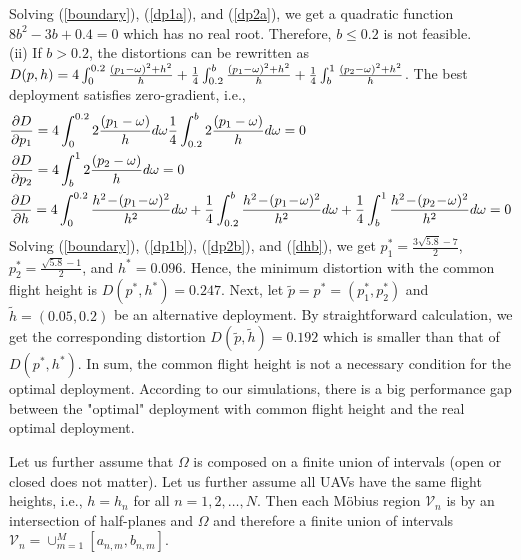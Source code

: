 \documentclass[smallabstract,smallcaptions]{dccpaper}
\newcommand{\Vor}{\ensuremath{\mathcal{V}}}         %
\begin{document}
Solving (\ref{boundary}), (\ref{dp1a}), and (\ref{dp2a}), we get a quadratic function $8b^2-3b+0.4=0$ which has no real root.
Therefore, $b\le0.2$ is not feasible.\\
(ii) If $b>0.2$, the distortions can be rewritten as
$D(p,h)=4\int_{0}^{0.2}\frac{(p_1-\omega)^2+h^2}{h}+\frac{1}{4}\int_{0.2}^{b}\frac{(p_1-\omega)^2+h^2}{h} + \frac{1}{4}\int_{b}^{1}\frac{(p_2-\omega)^2+h^2}{h}$. 
The best deployment satisfies zero-gradient, i.e.,
\begin{align}
    &\frac{\partial D}{\partial p_1} = 4\int_{0}^{0.2}2\frac{(p_1-\ome)}{h}d\ome
    \frac{1}{4}\int_{0.2}^{b}2\frac{(p_1-\ome)}{h}d\ome=0 \label{dp1b}\\
    &\frac{\partial D}{\partial p_2} = 4\int_{b}^{1}2\frac{(p_2-\ome)}{h}d\ome=0\label{dp2b}\\
    &\frac{\partial D}{\partial h} = 4\int_{0}^{0.2}\frac{h^2\!-\!(p_1\!-\!\ome)^2}{h^2}d\ome 
    + \frac{1}{4}\int_{0.2}^{b}\frac{h^2\!-\!(p_1\!-\!\ome)^2}{h^2}d\ome 
    + \frac{1}{4}\int_{b}^1\frac{h^2\!-\!(p_2\!-\!\ome)^2}{h^2}d\ome= 0\label{dhb}
\end{align}
%
Solving (\ref{boundary}), (\ref{dp1b}), (\ref{dp2b}), and (\ref{dhb}), we get $p^*_1=\frac{3\sqrt{5.8}-7}{2}$,
$p^*_2=\frac{\sqrt{5.8}-1}{2}$, and $h^*=0.096$.  Hence, the minimum distortion with the common flight height is $D(p^*,
h^*)=0.247$.  Next, let $\widetilde{p}=p^*=(p^{*}_1,p^*_2)$ and $\widetilde{h}=(0.05,0.2)$ be an alternative deployment.
By straightforward calculation, we get the corresponding distortion $D(\widetilde{p},\widetilde{h})=0.192$ which is
smaller than that of $D(p^*, h^*)$.  In sum, the common flight height is not a necessary condition for the optimal
deployment.  According to our simulations, there is a big performance gap between the "optimal" deployment with common
flight height and the real optimal deployment.  

\fi %
Let us further assume that
$\Omega$ is composed on a finite union of intervals  (open or closed does not matter).  Let us further assume all UAVs
have the same flight heights, i.e., $h=h_n$  for all $n=1,2,\dots,N$.  Then each  Möbius region $\Vor_n$ is by
 an intersection of half-planes and $\Omega$ and therefore a finite union of intervals
$\Vor_n=\cup_{m=1}^M [a_{n,m},b_{n,m}]$.  
\end{document}
